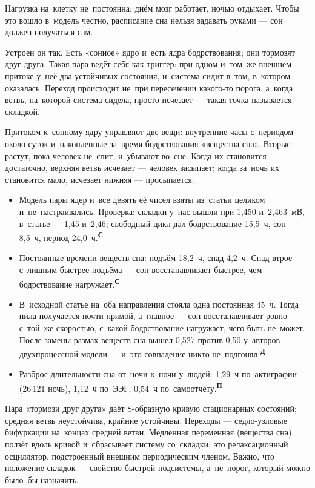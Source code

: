 \documentclass[11pt,a4paper,landscape,twocolumn]{article}
\newcommand{\tS}{\textsuperscript{\sffamily\bfseries\color{cB}С}}
\newcommand{\tP}{\textsuperscript{\sffamily\bfseries\color{cA}П}}
\newcommand{\tD}{\textsuperscript{\sffamily\bfseries\color{cO}Д}}
\newcommand{\facts}{\par\vspace{3pt}{\sffamily\bfseries\small\color{cM}Опорные факты}\par\vspace{-2pt}}
\begin{document}
Нагрузка на~клетку не~постоянна: днём мозг работает, ночью отдыхает. Чтобы это вошло в~модель честно, расписание сна нельзя задавать руками — сон должен получаться сам.

Устроен он так. Есть «сонное» ядро и~есть ядра бодрствования; они тормозят друг друга. Такая пара ведёт себя как триггер: при одном и~том~же внешнем притоке у~неё два устойчивых состояния, и~система сидит в~том, в~котором оказалась. Переход происходит не~при пересечении какого-то порога, а~когда ветвь, на~которой система сидела, просто исчезает — такая точка называется складкой.

Притоком к~сонному ядру управляют две вещи: внутренние часы с~периодом около суток и~накопленные за~время бодрствования «вещества сна». Вторые растут, пока человек не~спит, и~убывают во~сне. Когда их становится достаточно, верхняя ветвь исчезает — человек засыпает; когда за~ночь их становится мало, исчезает нижняя — просыпается.

\facts
\begin{itemize}
\item Модель пары ядер и~все девять её чисел взяты из~статьи целиком и~не~настраивались. Проверка: складки у~нас вышли при 1,450 и~2,463~мВ, в~статье — 1,45 и~2,46; свободный цикл дал бодрствование 15,5~ч, сон 8,5~ч, период 24,0~ч.\tS
\item Постоянные времени веществ сна: подъём 18,2~ч, спад 4,2~ч. Спад втрое с~лишним быстрее подъёма — сон восстанавливает быстрее, чем бодрствование нагружает.\tS
\item В~исходной статье на~оба направления стояла одна постоянная 45~ч. Тогда пила получается почти прямой, а~главное — сон восстанавливает ровно с~той~же скоростью, с~какой бодрствование нагружает, чего быть не~может. После замены размах веществ сна вышел 0,527 против 0,50 у~авторов двухпроцессной модели — и~это совпадение никто не~подгонял.\tD
\item Разброс длительности сна от~ночи к~ночи у~людей: 1,29~ч по~актиграфии (26\,121 ночь), 1,12~ч по~ЭЭГ, 0,54~ч по~самоотчёту.\tP
\end{itemize}

\begin{ineq}
Пара «тормози друг друга» даёт S-образную кривую стационарных состояний; средняя ветвь неустойчива, крайние устойчивы. Переходы — седло-узловые бифуркации на~концах средней ветви. Медленная переменная (вещества сна) ползёт вдоль кривой и~сбрасывает систему со~складки; это релаксационный осциллятор, подстроенный внешним периодическим членом. Важно, что положение складок — свойство быстрой подсистемы, а~не~порог, который можно было~бы назначить.
\end{ineq}
\end{document}
